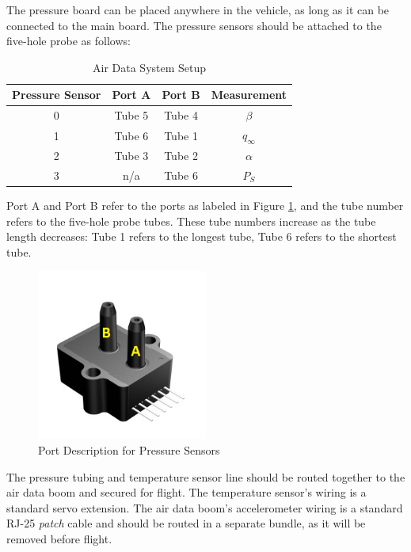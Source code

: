 The pressure board can be placed anywhere in the vehicle, as long as it can be connected to the main board. The pressure sensors should be attached to the five-hole probe as follows:

\begin{table}[ht]
\caption{Air Data System Setup}
\centering
\begin{tabular}{c c c c}
\hline\hline
 Pressure Sensor & Port A & Port B & Measurement\\
\hline
0 & Tube 5 & Tube 4 & $\beta$ \\
1 & Tube 6 & Tube 1 & $q_{\infty}$\\
2 & Tube 3 & Tube 2 & $\alpha$\\ 
3 & n/a & Tube 6 & $P_S$\\
\hline
\end{tabular}
\label{table:airDataSetup}
\end{table}

Port A and Port B refer to the ports as labeled in Figure \ref{fig:pressureLabels}, and the tube number refers to the five-hole probe tubes. These tube numbers increase as the tube length decreases: Tube 1 refers to the longest tube, Tube 6 refers to the shortest tube.

\begin{figure}[H]
  \centering
    \includegraphics[width=0.5\textwidth]{figures/allsensorsPressureLabeled.jpg}
      \caption{Port Description for Pressure Sensors} \label{fig:pressureLabels}
\end{figure}

The pressure tubing and temperature sensor line should be routed together to the air data boom and secured for flight. The temperature sensor's wiring is a standard servo extension. The air data boom's accelerometer wiring is a standard RJ-25 \textit{patch} cable and should be routed in a separate bundle, as it will be removed before flight.

